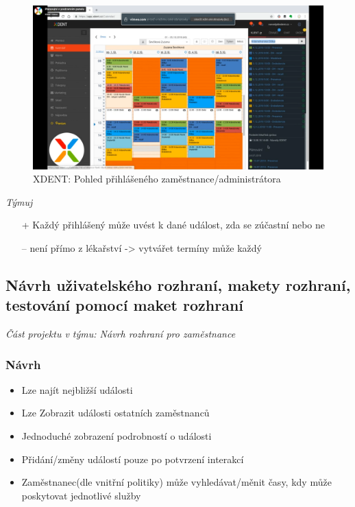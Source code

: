 \begin{figure}[htbp]
    \centering
    \includegraphics[width = \textwidth]{doc/latex/fig/ondra/xdent-admin.png}
    \caption{XDENT: Pohled přihlášeného zaměstnance/administrátora}
    \label{fig:Ondra_xdent_admin}
\end{figure}

\newpage

\noindent\emph{Týmuj}
\begin{itemize}
    \item[+] Každý přihlášený může uvést k dané událost, zda se zúčastní nebo ne
    \item[--] není přímo z lékařství -> vytvářet termíny může každý
\end{itemize}

\subsection{Návrh uživatelského rozhraní, makety rozhraní, testování pomocí maket rozhraní}

\emph{Část projektu v týmu: Návrh rozhraní pro zaměstnance}

\subsubsection*{Návrh}

\begin{itemize}
    \item Lze najít nejbližší události
    \item Lze Zobrazit události ostatních zaměstnanců
    \item Jednoduché zobrazení podrobností o události
    \item Přidání/změny událostí pouze po potvrzení interakcí
    \item Zaměstnanec(dle vnitřní politiky) může vyhledávat/měnit časy, kdy může poskytovat jednotlivé služby
\end{itemize}

